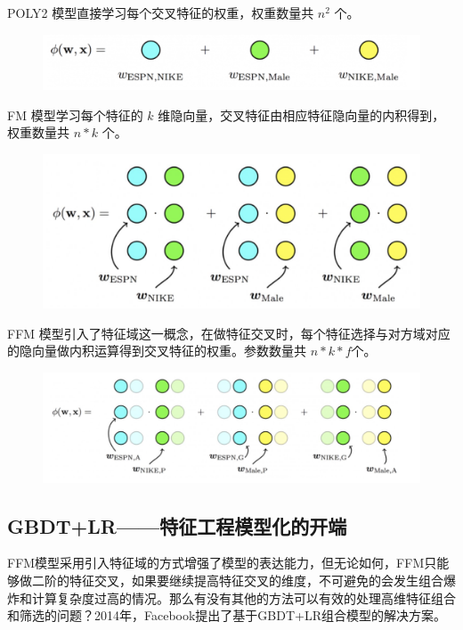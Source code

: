 \documentclass[12pt]{article}
\begin{document}
POLY2 模型直接学习每个交叉特征的权重，权重数量共 $n^2$ 个。
\begin{figure}[H]
    \centering
    \includegraphics[width=1\textwidth]{fig/CTR_Comparison_Poly2.png}
\end{figure}

FM 模型学习每个特征的 $k$ 维隐向量，交叉特征由相应特征隐向量的内积得到，权重数量共 $n*k$ 个。
\begin{figure}[H]
    \centering
    \includegraphics[width=1\textwidth]{fig/CTR_Comparison_FM.png}
\end{figure}

FFM 模型引入了特征域这一概念，在做特征交叉时，每个特征选择与对方域对应的隐向量做内积运算得到交叉特征的权重。参数数量共 $n*k*f$个。
\begin{figure}[H]
    \centering
    \includegraphics[width=1\textwidth]{fig/CTR_Comparison_FFM.png}
\end{figure}

\subsection{GBDT+LR——特征工程模型化的开端}
FFM模型采用引入特征域的方式增强了模型的表达能力，但无论如何，FFM只能够做二阶的特征交叉，如果要继续提高特征交叉的维度，不可避免的会发生组合爆炸和计算复杂度过高的情况。那么有没有其他的方法可以有效的处理高维特征组合和筛选的问题？2014年，Facebook提出了基于GBDT+LR组合模型的解决方案。
\end{document}
